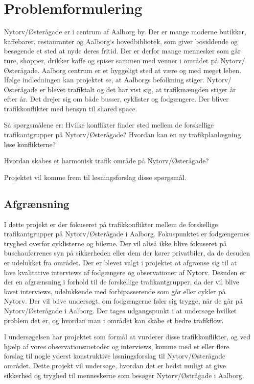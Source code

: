 \chapter{Problemformulering}
\label{chap:Problemformulering}


Nytorv/Østerågade er i centrum af Aalborg by. Der er mange moderne butikker, kaffebarer, restauranter og Aalborg`s hovedbibliotek, som giver bosiddende og besøgende et sted at nyde deres fritid. Der er derfor mange mennesker som går ture, shopper, drikker kaffe og spiser sammen med venner i området på Nytorv/Østerågade. Aalborg centrum er et hyggeligt sted at være og med meget leben. Ifølge indledningen kan projektet se, at Aalborgs befolkning stiger. Nytorv/Østerågade er blevet trafiktalt og det har vist sig, at trafikmængden stiger år efter år. Det drejer sig om både busser, cyklister og fodgængere. Der bliver trafikkonflikter med hensyn til shared space. 

Så spørgsmålene er:
Hvilke konflikter finder sted mellem de forskellige trafikantgrupper på Nytorv/Østerågade?
Hvordan kan en ny trafikplanlægning løse konflikterne?

Hvordan skabes et harmonisk trafik område på Nytorv/Østerågade? 

Projektet vil komme frem til løsningsforslag disse spørgsmål.



\section{Afgrænsning}
\label{sec:afgraensning}

I dette projekt er der fokuseret på trafikkonflikter mellem de forskellige trafikantgrupper på Nytorv/Østerågade i Aalborg. Fokuspunktet er fodgængernes tryghed overfor cyklisterne og bilerne. Der vil altså ikke blive fokuseret på buschauførrenes syn på sikkerheden eller dem der kører privatbiler, da de desuden er udelukket fra området. Der er blevet valgt i projektet at afgrænse sig til at lave kvalitative interviews af fodgængere og observationer af Nytorv. Desuden er der en afgrænsning i forhold til de forskellige trafikantgrupper, da der vil blive lavet interviews, udelukkende med forbipasserende som går eller cykler på Nytorv. Der vil blive undersøgt, om fodgængerne føler sig trygge, når de går på Nytorv/Østerågade i Aalborg. Der tages udgangspunkt i at undersøge hvilket problem det er, og hvordan man i området kan skabe et bedre trafikflow.

I undersøgelsen har projektet som formål at vurderer disse trafikkonflikter, og ved hjælp af vores observationsmetoder og interviews, komme med et eller flere forslag til nogle yderst konstruktive løsningsforslag til Nytorv/Østerågade området.  Dette projekt vil undersøge, hvordan det er bedst muligt at give sikkerhed og tryghed til menneskerne som besøger Nytorv/Østrågade i Aalborg.
